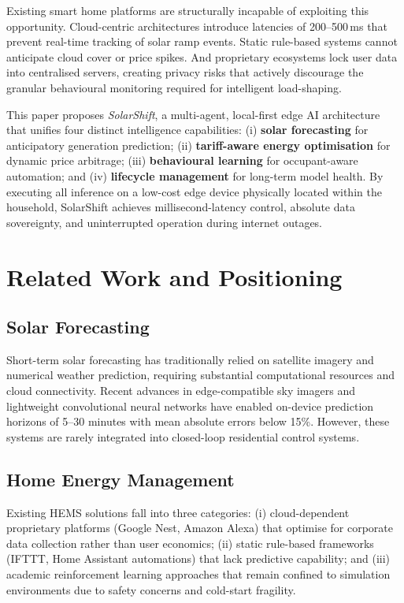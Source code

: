 \documentclass[11pt,a4paper]{article}
\begin{document}
Existing smart home platforms are structurally incapable of exploiting this opportunity. Cloud-centric architectures introduce latencies of 200--500\,ms that prevent real-time tracking of solar ramp events. Static rule-based systems cannot anticipate cloud cover or price spikes. And proprietary ecosystems lock user data into centralised servers, creating privacy risks that actively discourage the granular behavioural monitoring required for intelligent load-shaping.

This paper proposes \textit{SolarShift}, a multi-agent, local-first edge AI architecture that unifies four distinct intelligence capabilities: (i) \textbf{solar forecasting} for anticipatory generation prediction; (ii) \textbf{tariff-aware energy optimisation} for dynamic price arbitrage; (iii) \textbf{behavioural learning} for occupant-aware automation; and (iv) \textbf{lifecycle management} for long-term model health. By executing all inference on a low-cost edge device physically located within the household, SolarShift achieves millisecond-latency control, absolute data sovereignty, and uninterrupted operation during internet outages.

\section{Related Work and Positioning}
\label{sec:related}

\subsection{Solar Forecasting}

Short-term solar forecasting has traditionally relied on satellite imagery and numerical weather prediction, requiring substantial computational resources and cloud connectivity. Recent advances in edge-compatible sky imagers and lightweight convolutional neural networks have enabled on-device prediction horizons of 5--30 minutes with mean absolute errors below 15\%. However, these systems are rarely integrated into closed-loop residential control systems.

\subsection{Home Energy Management}

Existing HEMS solutions fall into three categories: (i) cloud-dependent proprietary platforms (Google Nest, Amazon Alexa) that optimise for corporate data collection rather than user economics; (ii) static rule-based frameworks (IFTTT, Home Assistant automations) that lack predictive capability; and (iii) academic reinforcement learning approaches that remain confined to simulation environments due to safety concerns and cold-start fragility.
\end{document}
